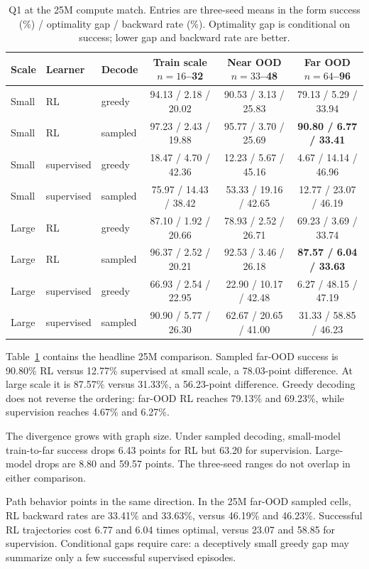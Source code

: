 \documentclass[10pt,twocolumn]{article}
\begin{document}
\begin{table}[t]
\centering
\caption{Q1 at the 25M compute match.  Entries are three-seed means in the
form success (\%) / optimality gap / backward rate (\%).  Optimality gap is
conditional on success; lower gap and backward rate are better.}
\label{tab:q1main}
\small
\setlength{\tabcolsep}{9pt}
\begin{tabular}{@{}lllccc@{}}
\toprule
Scale & Learner & Decode &
Train scale $n{=}16$--32 & Near OOD $n{=}33$--48 & Far OOD $n{=}64$--96\\
\midrule
Small & RL & greedy
 & 94.13 / 2.18 / 20.02 & 90.53 / 3.13 / 25.83 & 79.13 / 5.29 / 33.94\\
Small & RL & sampled
 & 97.23 / 2.43 / 19.88 & 95.77 / 3.70 / 25.69 & \textbf{90.80 / 6.77 / 33.41}\\
Small & supervised & greedy
 & 18.47 / 4.70 / 42.36 & 12.23 / 5.67 / 45.16 & 4.67 / 14.14 / 46.96\\
Small & supervised & sampled
 & 75.97 / 14.43 / 38.42 & 53.33 / 19.16 / 42.65 & 12.77 / 23.07 / 46.19\\
\midrule
Large & RL & greedy
 & 87.10 / 1.92 / 20.66 & 78.93 / 2.52 / 26.71 & 69.23 / 3.69 / 33.74\\
Large & RL & sampled
 & 96.37 / 2.52 / 20.21 & 92.53 / 3.46 / 26.18 & \textbf{87.57 / 6.04 / 33.63}\\
Large & supervised & greedy
 & 66.93 / 2.54 / 22.95 & 22.90 / 10.17 / 42.48 & 6.27 / 48.15 / 47.19\\
Large & supervised & sampled
 & 90.90 / 5.77 / 26.30 & 62.67 / 20.65 / 41.00 & 31.33 / 58.85 / 46.23\\
\bottomrule
\end{tabular}
\end{table}

Table~\ref{tab:q1main} contains the headline 25M comparison.  Sampled far-OOD
success is 90.80\% RL versus 12.77\% supervised at small scale, a
78.03-point difference.  At large scale it is 87.57\% versus 31.33\%, a
56.23-point difference.  Greedy decoding does not reverse the ordering:
far-OOD RL reaches 79.13\% and 69.23\%, while supervision reaches 4.67\% and
6.27\%.

The divergence grows with graph size.  Under sampled decoding, small-model
train-to-far success drops 6.43 points for RL but 63.20 for supervision.
Large-model drops are 8.80 and 59.57 points.  The three-seed ranges do not
overlap in either comparison.

Path behavior points in the same direction.  In the 25M far-OOD sampled cells,
RL backward rates are 33.41\% and 33.63\%, versus 46.19\% and 46.23\%.
Successful RL trajectories cost 6.77 and 6.04 times optimal, versus 23.07 and
58.85 for supervision.  Conditional gaps require care: a deceptively small
greedy gap may summarize only a few successful supervised episodes.
\end{document}
